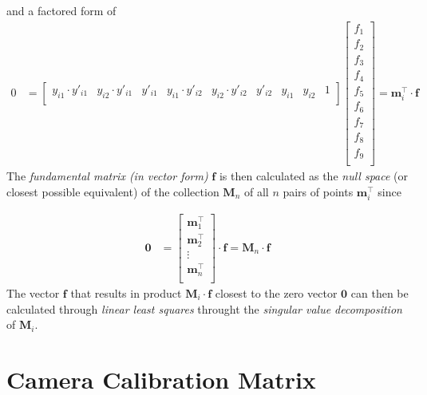 \noindent and a factored form of 
\begin{equation*}
\begin{split}
0&=\begin{bmatrix}
{y_{i1}\cdot y'_{i1}} &%
{y_{i2}\cdot y'_{i1}} &%
{y'_{i1}} &%
{y_{i1}\cdot y'_{i2}} &%
{y_{i2}\cdot y'_{i2}} &%
{y'_{i2}} &%
{y_{i1}} &%
{y_{i2}} &%
1\\ %
\end{bmatrix}\begin{bmatrix}
f_1\\%
f_2\\%
f_3\\%
f_4\\%
f_5\\%
f_6\\%
f_7\\%
f_8\\%
f_9\\%
\end{bmatrix}
=
\mathbf{m}{^\intercal_i}\cdot\mathbf{f}
\end{split}
\end{equation*}
\noindent The \textit{fundamental matrix (in vector form)} $\mathbf{f}$ is then calculated as the \textit{null space} (or closest possible equivalent) of the collection $\mathbf{M}_n$ of all $n$ pairs of points $\mathbf{m}{^\intercal_i}$ since

\begin{equation*}\begin{split}
\mathbf{0} &=
\begin{bmatrix}
\mathbf{m}{^\intercal_1}\\
\mathbf{m}{^\intercal_2}\\
\vdots\\
\mathbf{m}{^\intercal_n}\\
\end{bmatrix}
\cdot \mathbf{f}
=\mathbf{M}_n\cdot \mathbf{f}
\end{split}\end{equation*}
\noindent The vector $\mathbf{f}$ that results in product $\mathbf{M}_i\cdot\mathbf{f}$ closest to the zero vector $\mathbf{0}$ can then be calculated through \textit{linear least squares} throught the \textit{singular value decomposition} of $\mathbf{M}_i$.

\section{Camera Calibration Matrix}

